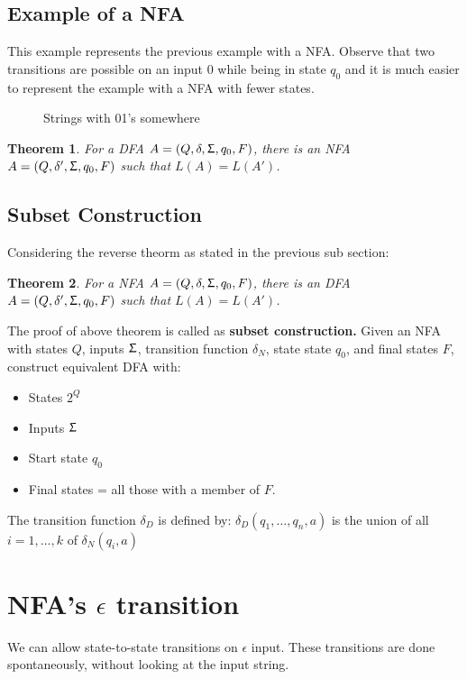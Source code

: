 \documentclass{report}
\newtheorem{theorem}{Theorem}
\begin{document}
\subsection{Example of a NFA}
This example represents the previous example with a NFA. Observe that two transitions are possible on an input 0 while being in state $q_0$ and it is much easier to represent the example with a NFA with fewer states. 
    \begin{figure}[ht] 
    \centering 
    \caption{Strings with 01's somewhere}
    \label{fig:my_label}
    \end{figure}

\begin{theorem}
For a DFA $A=(Q,\delta,\Upsigma,q_0,F)$, there is an NFA $A=(Q,\delta',\Upsigma,q_0,F)$ such that $L(A)=L(A')$.
\end{theorem}
\subsection{Subset Construction}
Considering the reverse theorm as stated in the previous sub section:
\begin{theorem}
For a NFA $A=(Q,\delta,\Upsigma,q_0,F)$, there is an DFA $A=(Q,\delta',\Upsigma,q_0,F)$ such that $L(A)=L(A')$.
\end{theorem}
The proof of above theorem is called as \textbf{subset construction.}
Given an NFA with states $Q$, inputs $\Upsigma$, transition function $\delta_N$, state state $q_0$, and final states $F$, construct equivalent DFA with:
\begin{itemize}
    \item States $2^Q$
    \item Inputs $\Upsigma$
    \item Start state $q_0$
    \item Final states = all those with a member of $F$.
\end{itemize}
The transition function $\delta_D$ is defined by: $\delta_D({q_1,\ldots,q_n},a)$ is the union of all $i=1,\ldots,k$ of $\delta_N(q_i,a)$


\section{NFA's $\epsilon$ transition}
We can allow state-to-state transitions on $\epsilon$ input. These transitions are done
spontaneously, without looking at the input string.
\end{document}
